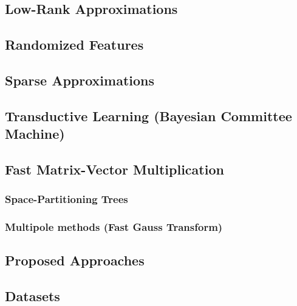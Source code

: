 \documentclass{article}
\begin{document}
\subsection{Low-Rank Approximations}

\subsection{Randomized Features}

\subsection{Sparse Approximations}

\subsection{Transductive Learning (Bayesian Committee Machine)}

\subsection{Fast Matrix-Vector Multiplication}

\subsubsection{Space-Partitioning Trees}
\subsubsection{Multipole methods (Fast Gauss Transform)}

\subsection{Proposed Approaches}

\subsection{Datasets}



\end{document}
